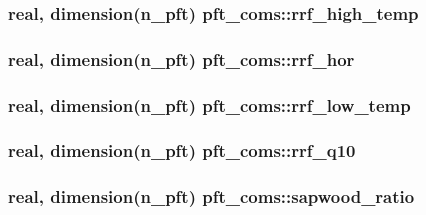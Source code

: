 \subsubsection[{rrf\+\_\+high\+\_\+temp}]{\setlength{\rightskip}{0pt plus 5cm}real, dimension(n\+\_\+pft) pft\+\_\+coms\+::rrf\+\_\+high\+\_\+temp}\label{namespacepft__coms_ae05300b2ffecef7671154f099c69e0bb}
\hypertarget{namespacepft__coms_a5fc24fd1652202216904fe39f1a2f318}{}
\subsubsection[{rrf\+\_\+hor}]{\setlength{\rightskip}{0pt plus 5cm}real, dimension(n\+\_\+pft) pft\+\_\+coms\+::rrf\+\_\+hor}\label{namespacepft__coms_a5fc24fd1652202216904fe39f1a2f318}
\hypertarget{namespacepft__coms_a87bba89213b158e2aed4dac23565b3d6}{}
\subsubsection[{rrf\+\_\+low\+\_\+temp}]{\setlength{\rightskip}{0pt plus 5cm}real, dimension(n\+\_\+pft) pft\+\_\+coms\+::rrf\+\_\+low\+\_\+temp}\label{namespacepft__coms_a87bba89213b158e2aed4dac23565b3d6}
\hypertarget{namespacepft__coms_aadcb3d9b31b09de0ee92c5c0d549ce28}{}
\subsubsection[{rrf\+\_\+q10}]{\setlength{\rightskip}{0pt plus 5cm}real, dimension(n\+\_\+pft) pft\+\_\+coms\+::rrf\+\_\+q10}\label{namespacepft__coms_aadcb3d9b31b09de0ee92c5c0d549ce28}
\hypertarget{namespacepft__coms_ad00617b976d68174e6d5fb6227be9d90}{}
\subsubsection[{sapwood\+\_\+ratio}]{\setlength{\rightskip}{0pt plus 5cm}real, dimension(n\+\_\+pft) pft\+\_\+coms\+::sapwood\+\_\+ratio}\label{namespacepft__coms_ad00617b976d68174e6d5fb6227be9d90}
\hypertarget{namespacepft__coms_a9e5f0badf00a834a699115fc8974d9f2}{}

